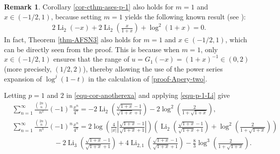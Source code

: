 \documentclass[11pt]{article}
\DeclareMathOperator{\Li}{Li}
\theoremstyle{plain}
\theoremstyle{definition}
\newtheorem{re}[thm]{Remark}
\begin{document}
\begin{re}
Corollary \ref{cor-cthm-ases-p-1} also holds for $m=1$ and $x \in (-1/2, 1)$, because setting $m=1$ yields the following known result (see \cite[Page 106, Eq. (2.6.15)]{A2000}):
\begin{align}\label{cor-one-case-1}
2\Li_2(-x)+2\Li_2\left(\frac{x}{1+x}\right)+\log^2(1+x)=0.
\end{align}
In fact, Theorem \ref{thm-AFSN3} also holds for $m=1$ and $x \in (-1/2, 1)$, which can be directly seen from the proof. This is because when $m=1$, only $x\in (-1/2, 1)$ ensures that the range of $u = G_1(-x) = (1+x)^{-1}\in (0, 2)$ (more precisely, $(1/2, 2)$), thereby allowing the use of the power series expansion of $\log^j(1-t)$ in the calculation of \eqref{proof-Apery-two}.
\end{re}

Letting $p=1$ and $2$ in \eqref{equ-cor-anotherexa} and applying \eqref{equ-p-1-Li} give
\begin{align}
&\sum_{n=1}^\infty \frac{\binom{2n}{n}}{n^{2}}(-1)^n\frac{x^n}{4^n}=-2\Li_{2}\left(\frac{\sqrt{1+x}-1}{\sqrt{1+x}+1}\right)-2\log^2\left(\frac{2}{1+\sqrt{1+x}}\right),\label{case2-equ-apery-1}\\
&\sum_{n=1}^\infty \frac{\binom{2n}{n}}{n^{3}}(-1)^n\frac{x^n}{4^n}=2\log\left(\frac{4}{|x|}\left\vert\frac{\sqrt{1+x}-1}{\sqrt{1+x}+1}\right\vert\right)\left(\Li_{2}\left(\frac{\sqrt{1+x}-1}{\sqrt{1+x}+1}\right)
+\log^2\left(\frac{2}{1+\sqrt{1+x}}\right)\right)\nonumber\\
&\qquad\qquad\qquad-2\Li_{3}\left(\frac{\sqrt{1+x}-1}{\sqrt{1+x}+1}\right)+4\Li_{2,1}\left(\frac{\sqrt{1+x}-1}{\sqrt{1+x}+1}\right)
-\frac{8}{3}\log^3\left(\frac{2}{1+\sqrt{1+x}}\right).\label{case2-equ-apery-2}
\end{align}
\end{document}
